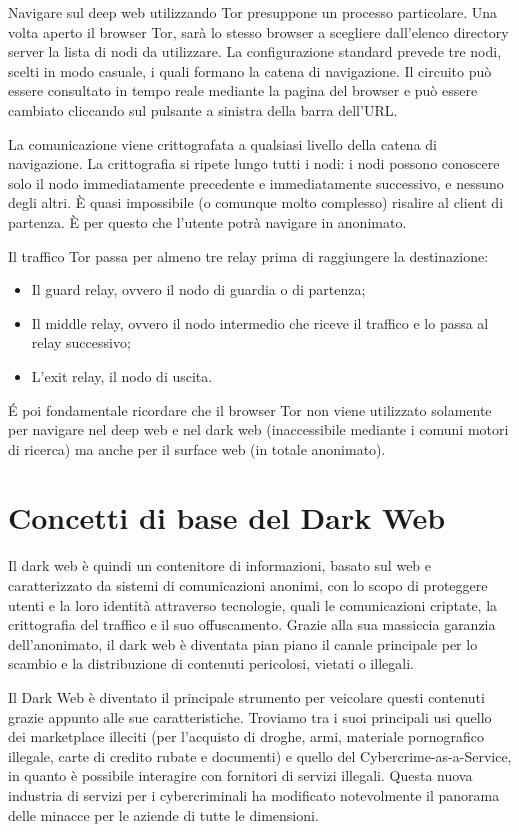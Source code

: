 Navigare sul deep web utilizzando Tor presuppone un processo particolare. Una volta aperto il browser Tor, sarà lo stesso browser a scegliere dall’elenco directory server la lista di nodi da utilizzare. La configurazione standard prevede tre nodi, scelti in modo casuale, i quali formano la catena di navigazione. Il circuito può essere consultato in tempo reale mediante la pagina del browser e può essere cambiato cliccando sul pulsante a sinistra della barra dell’URL. 

La comunicazione viene crittografata a qualsiasi livello della catena di navigazione. La crittografia si ripete lungo tutti i nodi: i nodi possono conoscere solo il nodo immediatamente precedente e immediatamente successivo, e nessuno degli altri. È quasi impossibile (o comunque molto complesso) risalire al client di partenza. È per questo che l’utente potrà navigare in anonimato. 

Il traffico Tor passa per almeno tre relay prima di raggiungere la destinazione: 

\begin{itemize}
\item Il guard relay, ovvero il nodo di guardia o di partenza;
\item Il middle relay, ovvero il nodo intermedio che riceve il traffico e lo passa al relay successivo;
\item L’exit relay, il nodo di uscita.
\end{itemize}


\'E poi fondamentale ricordare che il browser Tor non viene utilizzato solamente per navigare nel deep web e nel dark web (inaccessibile mediante i comuni motori di ricerca) ma anche per il surface web (in totale anonimato).

\section{Concetti di base del Dark Web}\label{sec:cap_sec_darkweb2}

Il dark web è quindi un contenitore di informazioni, basato sul web e caratterizzato da sistemi di comunicazioni anonimi, con lo scopo di proteggere utenti e la loro identità attraverso tecnologie, quali le comunicazioni criptate, la crittografia del traffico e il suo offuscamento.
Grazie alla sua massiccia garanzia dell'anonimato, il dark web è diventata pian piano il canale principale per lo scambio e la distribuzione di contenuti pericolosi, vietati o illegali.

Il Dark Web è diventato il principale strumento per veicolare questi contenuti grazie appunto alle sue caratteristiche. Troviamo tra i suoi principali usi quello dei marketplace illeciti (per l'acquisto di droghe, armi, materiale pornografico illegale, carte di credito rubate e documenti) e quello del Cybercrime-as-a-Service, in quanto è possibile interagire con fornitori di servizi illegali. Questa nuova industria di servizi per i cybercriminali ha modificato notevolmente il panorama delle minacce per le aziende di tutte le dimensioni. 

